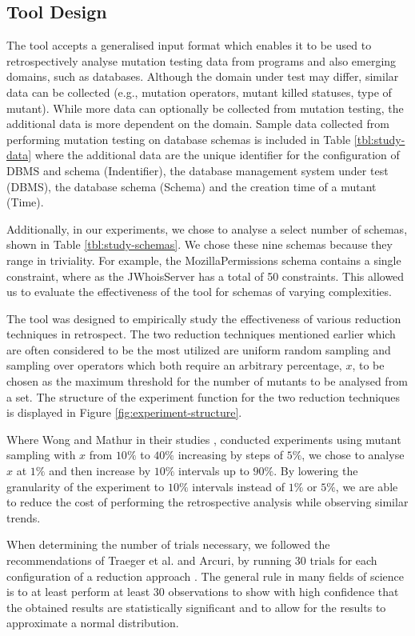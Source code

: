 \subsection{Tool Design}

The \mr tool accepts a generalised input format which enables it to be used to retrospectively analyse mutation testing
data from programs and also emerging domains, such as databases. Although the domain under test may differ,
similar data can be collected (e.g., mutation operators, mutant killed statuses, type of mutant). While more data
can optionally be collected from mutation testing, the additional data is more
dependent on the domain. Sample data collected from performing mutation testing on database schemas
is included in Table \ref{tbl:study-data} where the additional data are
the unique identifier for the configuration of DBMS and schema (Indentifier),
the database management system under test (DBMS), the database schema (Schema) and the creation time of a mutant (Time).

Additionally, in our experiments, we chose to analyse a select number of schemas, shown in Table \ref{tbl:study-schemas}.
We chose these nine schemas because they range in triviality. For example, the MozillaPermissions schema contains
a single constraint, where as the JWhoisServer has a total of 50 constraints. This allowed us to evaluate the effectiveness
of the \mr tool for schemas of varying complexities.

The \mr tool was designed to empirically study the effectiveness of
various reduction techniques in retrospect. The two reduction techniques mentioned earlier which are often considered
to be the most utilized are uniform random sampling
and sampling over operators which both require an arbitrary percentage, $x$, to be chosen as the maximum threshold
for the number of mutants to be analysed from a set. The structure of the experiment function for the two
reduction techniques is displayed in Figure \ref{fig:experiment-structure}.

Where Wong and Mathur in their studies \cite{mathur1994empirical}, \cite{wong1993mutation} conducted
experiments using mutant sampling with $x$ from $10\%$ to $40\%$ increasing by steps of $5\%$, we
chose to analyse $x$ at $1\%$ and then increase by $10\%$ intervals up to $90\%$. By lowering
the granularity of the experiment to $10\%$ intervals instead of
$1\%$ or $5\%$, we are able to reduce the cost of performing the retrospective analysis while observing
similar trends.

When determining the number of trials necessary, we followed
the recommendations of Traeger et al. and Arcuri, by running 30 trials for each configuration of a reduction approach \cite{traeger2008nine, arcuri2014hitchhiker}.
The general rule in many fields of science is to at least perform at least 30 observations to show with high confidence
that the obtained results are statistically significant and to allow for the results to approximate a normal
distribution.
